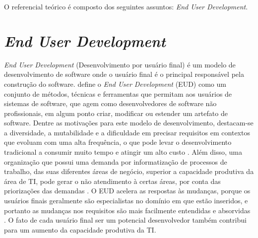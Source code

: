 O referencial teórico é composto dos seguintes assuntos: \textit{End User Development}.


\section{\textit{End User Development}}

\textit{End User Development} (Desenvolvimento por usuário final) é um modelo de desenvolvimento de software onde o usuário final é o principal responsável pela construção do software.  define o \textit{End User Development} (EUD) como um conjunto de métodos, técnicas e ferramentas que permitam aos usuários de sistemas de software, que agem como desenvolvedores de software não profissionais, em algum ponto criar, modificar ou estender um artefato de software. Dentre as motivações para este modelo de desenvolvimento, destacam-se a diversidade, a mutabilidade e a dificuldade em precisar requisitos em contextos que evoluam com uma alta frequência, o que pode levar o desenvolvimento tradicional a consumir muito tempo e atingir um alto custo \cite{lieberman2006}. Além disso, uma organização que possui uma demanda por informatização de processos de trabalho, das suas diferentes áreas de negócio, superior a capacidade produtiva da área de TI, pode gerar o não atendimento à certas áreas, por conta das priorizações das demandas \cite{artigoTcuGovTI}. O EUD acelera as respostas às mudanças, porque os usuários finais geralmente são especialistas no domínio em que estão inseridos, e portanto as mudanças nos requisitos são mais facilmente entendidas e absorvidas \cite{fischer2004}. O fato de cada usuário final ser um potencial desenvolvedor também contribui para um aumento da capacidade produtiva da TI.

